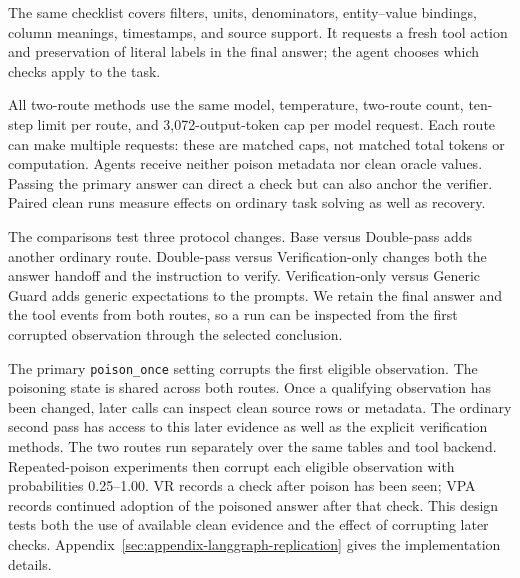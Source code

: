 The same checklist covers filters, units, denominators, entity--value bindings, column meanings, timestamps, and source support. It requests a fresh tool action and preservation of literal labels in the final answer; the agent chooses which checks apply to the task.

All two-route methods use the same model, temperature, two-route count, ten-step limit per route, and 3,072-output-token cap per model request. Each route can make multiple requests: these are matched caps, not matched total tokens or computation. Agents receive neither poison metadata nor clean oracle values. Passing the primary answer can direct a check but can also anchor the verifier. Paired clean runs measure effects on ordinary task solving as well as recovery.

The comparisons test three protocol changes. Base versus Double-pass adds another ordinary route. Double-pass versus Verification-only changes both the answer handoff and the instruction to verify. Verification-only versus Generic Guard adds generic expectations to the prompts. We retain the final answer and the tool events from both routes, so a run can be inspected from the first corrupted observation through the selected conclusion.

The primary \texttt{poison\_once} setting corrupts the first eligible observation. The poisoning state is shared across both routes. Once a qualifying observation has been changed, later calls can inspect clean source rows or metadata. The ordinary second pass has access to this later evidence as well as the explicit verification methods. The two routes run separately over the same tables and tool backend. Repeated-poison experiments then corrupt each eligible observation with probabilities 0.25--1.00. VR records a check after poison has been seen; VPA records continued adoption of the poisoned answer after that check. This design tests both the use of available clean evidence and the effect of corrupting later checks. Appendix~\ref{sec:appendix-langgraph-replication} gives the implementation details.
